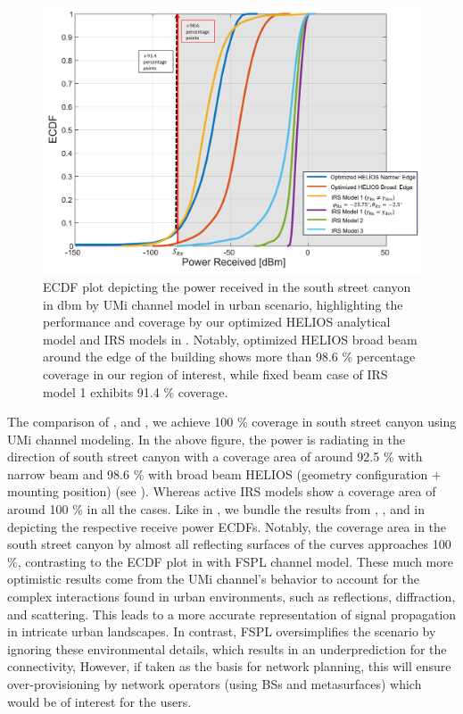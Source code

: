\begin{figure}[H]
	\centering
	\includegraphics[width=0.9\linewidth]{images/Section 4 Images/Perfect_result_plot_UMi}
	\caption{ECDF plot depicting the power received in the south street canyon in \si{\decibel}m by UMi channel model in urban scenario, highlighting the performance and coverage by our optimized HELIOS analytical model and IRS models \cite{8936989, ntontin2021optimal, tang2020wireless} in . Notably, optimized HELIOS broad beam around the edge of the building shows more than 98.6 \% percentage coverage in our region of interest, while fixed beam case of IRS model 1 exhibits 91.4 \% coverage.}
	\label{fig:Perfect_result_plot_UMi}
\end{figure}
The comparison of , and , we achieve \num{100} \% coverage in south street canyon using UMi channel modeling. In the above figure, the power is radiating in the direction of south street canyon with a coverage area of around \num{92.5} \% with narrow beam and \num{98.6} \% with broad beam HELIOS (geometry configuration + mounting position) (see ). Whereas active IRS models show a coverage area of around \num{100} \% in all the cases. Like in , we bundle the results from , , and  in  depicting the respective receive power ECDFs. Notably, the coverage area in the south street canyon by almost all reflecting surfaces of the curves approaches \num{100} \%, contrasting to the ECDF plot in  with FSPL channel model. These much more optimistic results come from the UMi channel's behavior to account for the complex interactions found in urban environments, such as reflections, diffraction, and scattering. This leads to a more accurate representation of signal propagation in intricate urban landscapes. In contrast, FSPL oversimplifies the scenario by ignoring these environmental details, which results in an underprediction for the connectivity, However, if taken as the basis for network planning, this will ensure over-provisioning by network operators (using BSs and metasurfaces) which would be of interest for the users.
